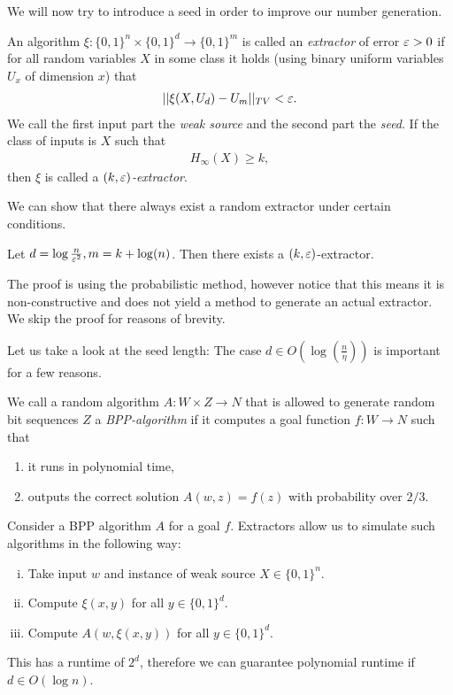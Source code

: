 We will now try to introduce a seed in order to improve our number generation.
\begin{definition}
    An algorithm $\xi : \{0,1\}^n \times \{0,1\}^d \rightarrow \{0,1\}^m$
    is called an \emph{extractor} of error $\varepsilon > 0$ if
    for all random variables $X$ in some class it holds (using binary uniform variables $U_x$ of dimension $x$) that
    \begin{align*}
        ||\xi(X, U_d) - U_m||_{TV} < \varepsilon.
    \end{align*}
    We call the first input part the \emph{weak source} and the second part the \emph{seed}.
    If the class of inputs is $X$ such that
    \begin{align*}
        H_\infty(X) \geq k,
    \end{align*}
    then $\xi$ is called a \emph{$(k,\varepsilon)$-extractor}.
\end{definition}
We can show that there always exist a random extractor under certain conditions.
\begin{lemma}
    Let $d = \log\frac{n}{\varepsilon^2}, m = k + \log(n)$.
    Then there exists a $(k, \varepsilon)$-extractor.
\end{lemma}
The proof is using the probabilistic method, however notice that this means it is non-constructive
and does not yield a method to generate an actual extractor.
We skip the proof for reasons of brevity.

Let us take a look  at the seed length:
The case $d \in O(\log\left(\frac{n}{\eta}\right))$
is important for a few reasons.
\begin{definition}
    We call a random algorithm $A : W \times Z \rightarrow N$
    that is allowed to generate random bit sequences $Z$
    a \emph{BPP-algorithm}
    if it computes a goal function $f : W \rightarrow N$ such that
    \begin{enumerate}
        \item it runs in polynomial time,
        \item outputs the correct solution $A(w,z)=f(z)$ with probability over $2/3$.
    \end{enumerate}
\end{definition}
Consider a BPP algorithm $A$ for a goal $f$.
Extractors allow us to simulate such algorithms in the following way:
\begin{enumerate}[(i)]
    \item Take input $w$ and instance of weak source $X \in \{0,1\}^n$.
    \item Compute $\xi(x,y)$ for all $y \in \{0,1\}^d$.
    \item Compute $A(w,\xi(x,y))$ for all $y \in \{0,1\}^d$.
\end{enumerate}
This has a runtime of $2^d$, therefore we can guarantee polynomial runtime if
$d \in O(\log n)$.

